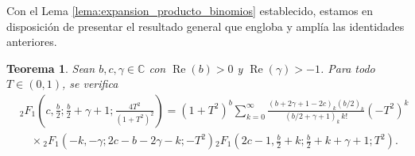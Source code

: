 \documentclass[12pt,a4paper]{book}
\newtheorem{theorem}{Teorema}
\begin{document}
Con el Lema \ref{lema:expansion_producto_binomios} establecido, estamos en disposición de presentar el resultado general que engloba y amplía las identidades anteriores.

\begin{theorem}
\label{thm:identidad_general_maestra}
Sean $b, c, \gamma \in \mathbb{C}$ con $\operatorname{Re}(b) > 0$ y $\operatorname{Re}(\gamma) > -1$. Para todo $T \in (0, 1)$, se verifica 
\begin{align*}
    & {}_{2}F_{1}\left(c, \frac{b}{2}; \frac{b}{2}+\gamma+1; \frac{4T^2}{(1+T^2)^2}\right) = (1+T^2)^b \sum_{k=0}^{\infty} \frac{(b+2\gamma+1-2c)_k (b/2)_k}{(b/2+\gamma+1)_k \, k!} (-T^2)^{k} \\
    &\quad \times {}_{2}F_{1}\left(-k, -\gamma; 2c-b-2\gamma-k; -T^2\right)
    {}_{2}F_{1}\left(2c-1, \frac{b}{2}+k; \frac{b}{2}+k+\gamma+1; T^2\right).
\end{align*}
\end{theorem}
\end{document}
